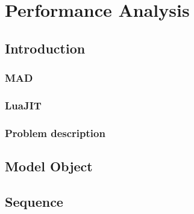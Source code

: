 \documentclass[12pt, oneside]{Thesis}
\begin{document}




\mainmatter
\pagestyle{fancy}

\part{Performance Analysis}
\label{Part:mad}

  \chapter{Introduction}
  \label{Chapt:Intro}

    \section{MAD}
    \label{Sec:Verbose}
    

    \section{LuaJIT}
    \label{Sec:Verbose}
    

    \section{Problem description}
    \label{Sec:Verbose}
    

  \chapter{Model Object}
  \label{Chapt:MO}

  \chapter{Sequence}
  \label{Chapt:seq}
\end{document}
